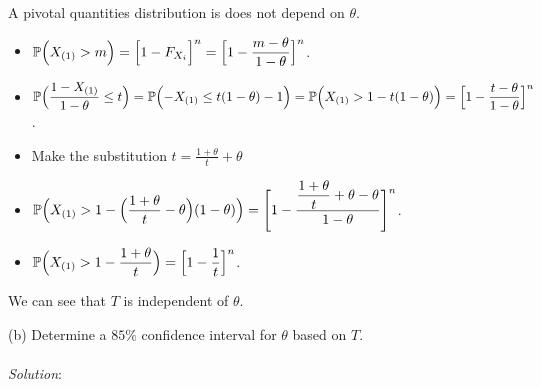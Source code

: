 \documentclass[12pt]{article}
\newcommand{\ds}{\displaystyle}
\begin{document}
\noindent
A pivotal quantities distribution is does not depend on $ \theta $. \\

\noindent

\begin{itemize}
    \item $ \ds \mathbb{P} \Bigl( X_{(1)} > m \Bigr) = \Bigl[ 1 - F_{X_{i}} \Bigr]^{n} = \Bigl[ 1 - \frac{m - \theta}{1 - \theta} \Bigr]^{n} $. \\
    \item $ \ds \mathbb{P} \Bigl( \frac{1 - X_{(1)}}{1 - \theta} \le t \Bigr) = \mathbb{P} \Bigl( -X_{(1)} \le t(1 - \theta) - 1 \Bigr) = \mathbb{P} \Bigl( X_{(1)} > 1 - t(1 - \theta) \Bigr) = \Bigl[ 1 - \frac{t - \theta}{1 - \theta} \Bigr]^{n} $. \\
    \item Make the substitution $ \ds t = \frac{1 + \theta}{t} + \theta $  
    \item $ \ds \mathbb{P} \Bigl( X_{(1)} > 1 - \Bigl( \frac{1 + \theta}{t} - \theta \Bigr)(1 - \theta) \Bigr) = \Biggl[ 1 - \frac{\ds \frac{1 + \theta}{t} + \theta - \theta}{1 - \theta} \Biggr]^{n} $. \\
    \item $ \ds \mathbb{P} \Bigl( X_{(1)} > 1 - \frac{1 + \theta}{t} \Bigr) = \Bigl[ 1 - \frac{1}{t} \Bigr]^{n} $. \\
\end{itemize}

\noindent
We can see that $ T $ is independent of $ \theta $. \\

\vspace{2.5mm}

\newpage

(b) Determine a $ 85\% $ confidence interval for $ \theta $ based on $ T $. \\
\vspace{2.5mm} \\
\textit{Solution}:
\vspace{2.5mm} \\
\end{document}
